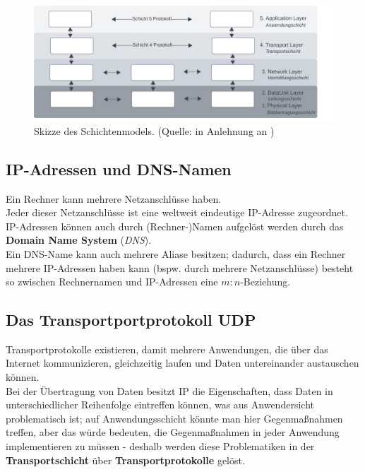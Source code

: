 \begin{figure}
    \centering
    \includegraphics[width=16cm]{chapters/fopt5/img/layers}
    \caption{Skizze des Schichtenmodels. (Quelle: in Anlehnung an \cite[257, Bild 5.2]{Oec22})}
    \label{fig:layers}
\end{figure}


\subsection{IP-Adressen und DNS-Namen}

Ein Rechner kann mehrere Netzanschlüsse haben.\\

\noindent
Jeder dieser Netzanschlüsse ist eine weltweit eindeutige IP-Adresse zugeordnet.\\

\noindent
IP-Adressen können auch durch (Rechner-)Namen aufgelöst werden durch das \textbf{Domain Name System} (\textit{DNS}).\\

\noindent
Ein DNS-Name kann auch mehrere Aliase besitzen; dadurch, dass ein Rechner mehrere IP-Adressen haben kann (bspw. durch mehrere Netzanschlüsse) besteht so zwischen Rechnernamen und IP-Adressen eine $m:n$-Beziehung.


\subsection{Das Transportportprotokoll UDP}

Transportprotokolle existieren, damit mehrere Anwendungen, die über das Internet kommunizieren, gleichzeitig laufen und Daten untereinander austauschen können.\\

\noindent
Bei der Übertragung von Daten besitzt IP die Eigenschaften, dass Daten in unterschiedlicher Reihenfolge eintreffen können, was aus Anwendersicht problematisch ist; auf Anwendungsschicht könnte man hier Gegenmaßnahmen treffen, aber das würde bedeuten, die Gegenmaßnahmen in jeder Anwendung implementieren zu müssen - deshalb werden diese Problematiken in der \textbf{Transportschicht} über \textbf{Transportprotokolle} gelöst.\\

